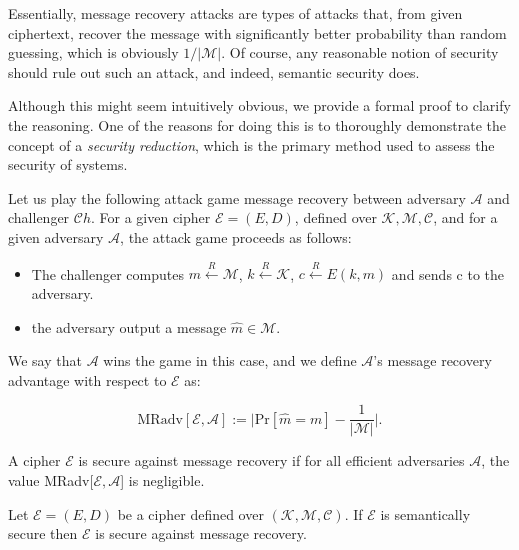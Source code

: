 \documentclass[../lecture-notes-148x210.tex]{subfiles}
\begin{document}
Essentially, message recovery attacks are types of attacks that, from given ciphertext, recover the message with significantly better probability than random guessing, which is obviously $1/|\mathcal{M}|$.
Of course, any reasonable notion of security should rule out such an attack, and indeed, semantic security does.

Although this might seem intuitively obvious, we provide a formal proof to clarify the reasoning. 
One of the reasons for doing this is to thoroughly demonstrate the concept of a \emph{security reduction}, which is the primary method used to assess the security of systems.

Let us play the following attack game message recovery between adversary $\mathcal{A}$ and challenger $\mathcal{C}h$.
For a given cipher $\mathcal{E} = (E, D)$, defined over $\mathcal{K}, \mathcal{M}, \mathcal{C}$, and for a given adversary $\mathcal{A}$, the attack game proceeds as follows: 

\begin{itemize}
    \item The challenger computes $m \xleftarrow{R} \mathcal{M}$, $k \xleftarrow{R} \mathcal{K}$, $c \xleftarrow{R} E(k, m)$ and sends c to the adversary.
    \item the adversary output a message $\hat{m} \in \mathcal{M}$.
\end{itemize}

We say that $\mathcal{A}$ wins the game in this case, and we define $\mathcal{A}$'s message recovery advantage with respect to $\mathcal{E}$ as:

\begin{equation*}
    \text{MRadv}[\mathcal{E}, \mathcal{A}] := \Bigg|\text{Pr}[\hat{m} = m] - \frac{1}{|\mathcal{M}|}\Bigg|.
\end{equation*}

\begin{definition} 
    A cipher $\mathcal{E}$ is secure against message recovery if for all efficient adversaries $\mathcal{A}$, the value MRadv[$\mathcal{E}, \mathcal{A}$] is negligible.
\end{definition}

\begin{theorem}
    Let $\mathcal{E} = (E, D)$ be a cipher defined over $(\mathcal{K}, \mathcal{M}, \mathcal{C})$. If $\mathcal{E}$ is semantically secure then $\mathcal{E}$ is secure against message recovery.
\end{theorem}
\end{document}
